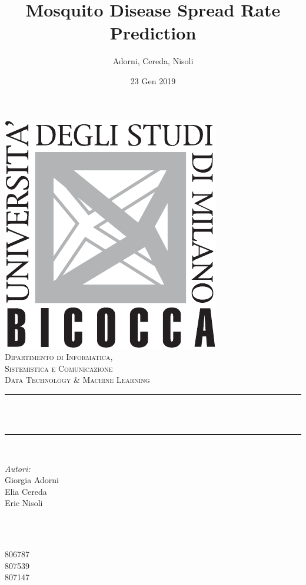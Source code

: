 \documentclass[12pt]{article}
\title{Mosquito Disease Spread Rate Prediction}								%
\author{Adorni, Cereda, Nisoli}								%
\date{23 Gen 2019}											%
\makeatletter
\let\thetitle\@title
\makeatother
\begin{document}

\begin{titlepage}
	\centering
    \vspace*{0.5 cm}
    \includegraphics[scale = 0.5]{LogoBicocca.pdf}\\[1.0 cm]
    \textsc{\Large Dipartimento di Informatica, \\Sistemistica e Comunicazione}\\[2.0 cm]
	\textsc{\Large Data Technology \& Machine Learning}\\[0.5 cm]		
	\rule{\linewidth}{0.2 mm} \\[0.4 cm]
	{ \huge \bfseries \thetitle}\\
	\rule{\linewidth}{0.2 mm} \\[1.5 cm]
	
	\begin{minipage}{0.4\textwidth}
		\begin{flushleft} \large
			\emph{Autori:}\\
			Giorgia Adorni\\
            Elia Cereda\\
            Eric Nisoli\\
			\end{flushleft}
			\end{minipage}~
			\begin{minipage}{0.4\textwidth}
            
			\begin{flushright} \large
			\emph{} \\
			806787\\
            807539\\
            807147\\
		\end{flushright}
        
	\end{minipage}\\[2 cm]
	
\end{titlepage}
\end{document}
